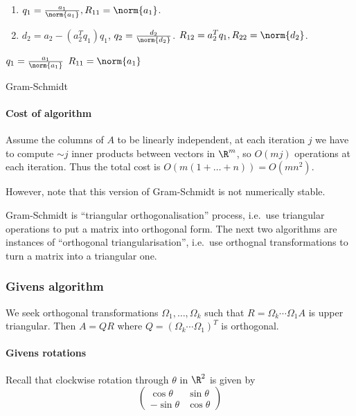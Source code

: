 \documentclass[a4paper]{article}
\begin{document}
\begin{enumerate}
\item \(q_1 = \frac{a_1}{\norm{a_1}}, R_{11} = \norm{a_1}\).
\item \(d_2 = a_2 - (a_2^Tq_1)q_1\), \(q_2 = \frac{d_2}{\norm{d_2}}\). \(R_{12} = a_2^Tq_1, R_{22} = \norm{d_2}\).
\end{enumerate}

\begin{algorithm}
  \(q_1 = \frac{a_1}{\norm{a_1}}\)\;
  \(R_{11} = \norm{a_1}\)\;
  \caption{Gram-Schmidt}
\end{algorithm}

\paragraph{Cost of algorithm}

Assume the columns of \(A\) to be linearly independent, at each iteration \(j\) we have to compute \(\sim j\) inner products between vectors in \(\R^m\), so \(O(mj)\) operations at each iteration. Thus the total cost is \(O(m(1 + \dots + n)) = O(mn^2)\).

However, note that this version of Gram-Schmidt is not numerically stable.

Gram-Schmidt is ``triangular orthogonalisation'' process, i.e.\ use triangular operations to put a matrix into orthogonal form. The next two algorithms are instances of ``orthogonal triangularisation'', i.e.\ use orthognal transformations to turn a matrix into a triangular one.

\subsubsection{Givens algorithm}

We seek orthogonal transformations \(\Omega_1, \dots, \Omega_k\) such that \(R = \Omega_k \cdots \Omega_1 A\) is upper triangular. Then \(A = QR\) where \(Q = (\Omega_k \cdots \Omega_1)^T\) is orthogonal.

\paragraph{Givens rotations}

Recall that clockwise rotation through \(\theta\) in \(\R^2\) is given by
\[
  \begin{pmatrix}
    \cos \theta & \sin \theta \\
    -\sin \theta & \cos \theta
  \end{pmatrix}
\]
\end{document}
